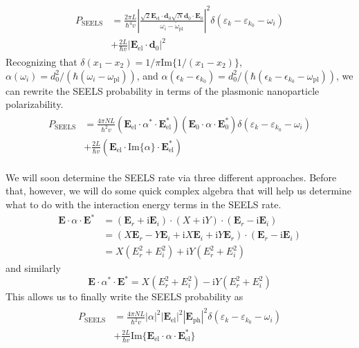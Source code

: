 \documentclass [11pt, proquest] {uwthesis}[2016/11/22]
\begin{document}
\begin{align}
\begin{split}
  P_{\textrm{SEELS}} &= \frac{2\pi L}{\hbar^4v}\left|\frac{\sqrt{2}\textbf{E}_{\textrm{el}}\cdot\textbf{d}_0 \sqrt{N}\textbf{d}_0\cdot\textbf{E}_{0}}{\omega_i - \tilde{\omega}_{\textrm{pl}}}\right|^2\delta(\varepsilon_k - \varepsilon_{k_0}-\omega_i)\\
  &+ \frac{2L}{\hbar v}|\textbf{E}_{\textrm{el}}\cdot\textbf{d}_0|^2
  \label{change_eels}
  \end{split}
\end{align}
Recognizing that $\delta(x_1 - x_2) = 1/\pi\textrm{Im}\{1/(x_1-x_2)\}$, $\alpha(\omega_i) = d_0^2/(\hbar(\omega_i-\omega_{\textrm{pl}}))$, and $\alpha(\epsilon_k-\epsilon_{k_0}) = d_0^2/(\hbar(\epsilon_k-\epsilon_{k_0}-\omega_{\textrm{pl}}))$, we can rewrite the SEELS probability in terms of the plasmonic nanoparticle polarizability.
\begin{align}
\begin{split}
  P_{\textrm{SEELS}} &= \frac{4\pi NL}{\hbar^2v}(\textbf{E}_{\textrm{el}}\cdot\alpha^*\cdot\textbf{E}_{\textrm{el}}^*)(\textbf{E}_0\cdot\alpha\cdot\textbf{E}_0^*)\delta(\varepsilon_k - \varepsilon_{k_0}-\omega_i)\\
  &+ \frac{2L}{\hbar v}(\textbf{E}_{\textrm{el}}\cdot\textrm{Im}\{\alpha\}\cdot\textbf{E}_{\textrm{el}}^*)
  \label{seels_with_polar}
  \end{split}
\end{align}

We will soon determine the SEELS rate via three different approaches. Before that, however, we will do some quick complex algebra that will help us determine what to do with the interaction energy terms in the SEELS rate.
\begin{equation}
\begin{aligned}
\textbf{E}\cdot\alpha\cdot\textbf{E}^* &= (\textbf{E}_r+\textrm{i}\textbf{E}_i)\cdot(X+\textrm{i}Y)\cdot(\textbf{E}_r-\textrm{i}\textbf{E}_i)\\
& = (X\textbf{E}_r - Y\textbf{E}_i + \textrm{i}X\textbf{E}_i + \textrm{i}Y\textbf{E}_r)\cdot(\textbf{E}_r-\textrm{i}\textbf{E}_i)\\
& = X(E_r^2 + E_i^2) + \textrm{i}Y(E_r^2 + E_i^2)
\label{alpha_1}
\end{aligned}
\end{equation}
and similarly 
\begin{equation}
\textbf{E}\cdot\alpha^*\cdot\textbf{E}^* = X(E_r^2 + E_i^2) -\textrm{i}Y(E_r^2 + E_i^2)
\label{alpha_2}
\end{equation}
This allows us to finally write the SEELS probability as
\begin{align}
\begin{split}
  P_{\textrm{SEELS}} &= \frac{4\pi NL}{\hbar^2v}|\alpha|^2|\textbf{E}_{\textrm{el}}|^2|\textbf{E}_{\textrm{ph}}|^2\delta(\varepsilon_k - \varepsilon_{k_0}-\omega_i)\\
  &+ \frac{2L}{\hbar v}\textrm{Im}\{\textbf{E}_{\textrm{el}}\cdot\alpha\cdot\textbf{E}_{\textrm{el}}^*\}
  \label{alpha_squared}
  \end{split}
\end{align}
\end{document}
